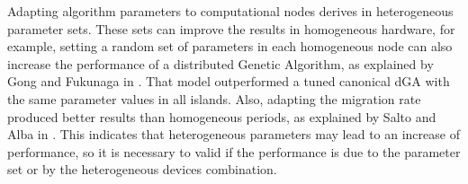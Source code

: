 \documentclass[final,1p,times]{elsarticle}
\begin{document}

Adapting algorithm parameters to computational nodes derives in heterogeneous parameter sets. These sets can improve the results in homogeneous hardware, for example, setting a random set of parameters in each homogeneous node can also increase the
performance of a distributed Genetic Algorithm, as explained by Gong
and Fukunaga in \cite{HETEROGENEOUSPARAMETERS}. That model
outperformed a tuned canonical dGA with the same parameter values in
all islands. Also, adapting the migration rate produced better
results than homogeneous periods, as explained by Salto and Alba in
\cite{HETEROGENEOUSMIGRATION}. This indicates that heterogeneous parameters
 may lead to an increase of performance, so it is necessary to valid if the 
 performance is due to the parameter set or by the heterogeneous devices combination.
\end{document}
